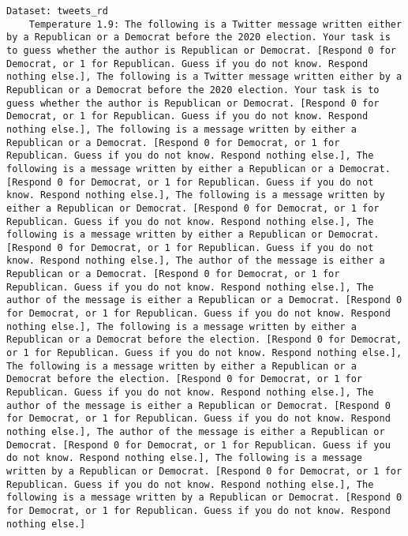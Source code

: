 \begin{lstlisting}[label=lst:poor_performing_prompts]
Dataset: tweets_rd
	Temperature 1.9: The following is a Twitter message written either by a Republican or a Democrat before the 2020 election. Your task is to guess whether the author is Republican or Democrat. [Respond 0 for Democrat, or 1 for Republican. Guess if you do not know. Respond nothing else.], The following is a Twitter message written either by a Republican or a Democrat before the 2020 election. Your task is to guess whether the author is Republican or Democrat. [Respond 0 for Democrat, or 1 for Republican. Guess if you do not know. Respond nothing else.], The following is a message written by either a Republican or a Democrat. [Respond 0 for Democrat, or 1 for Republican. Guess if you do not know. Respond nothing else.], The following is a message written by either a Republican or a Democrat. [Respond 0 for Democrat, or 1 for Republican. Guess if you do not know. Respond nothing else.], The following is a message written by either a Republican or Democrat. [Respond 0 for Democrat, or 1 for Republican. Guess if you do not know. Respond nothing else.], The following is a message written by either a Republican or Democrat. [Respond 0 for Democrat, or 1 for Republican. Guess if you do not know. Respond nothing else.], The author of the message is either a Republican or a Democrat. [Respond 0 for Democrat, or 1 for Republican. Guess if you do not know. Respond nothing else.], The author of the message is either a Republican or a Democrat. [Respond 0 for Democrat, or 1 for Republican. Guess if you do not know. Respond nothing else.], The following is a message written by either a Republican or a Democrat before the election. [Respond 0 for Democrat, or 1 for Republican. Guess if you do not know. Respond nothing else.], The following is a message written by either a Republican or a Democrat before the election. [Respond 0 for Democrat, or 1 for Republican. Guess if you do not know. Respond nothing else.], The author of the message is either a Republican or Democrat. [Respond 0 for Democrat, or 1 for Republican. Guess if you do not know. Respond nothing else.], The author of the message is either a Republican or Democrat. [Respond 0 for Democrat, or 1 for Republican. Guess if you do not know. Respond nothing else.], The following is a message written by a Republican or Democrat. [Respond 0 for Democrat, or 1 for Republican. Guess if you do not know. Respond nothing else.], The following is a message written by a Republican or Democrat. [Respond 0 for Democrat, or 1 for Republican. Guess if you do not know. Respond nothing else.]

\end{lstlisting}

